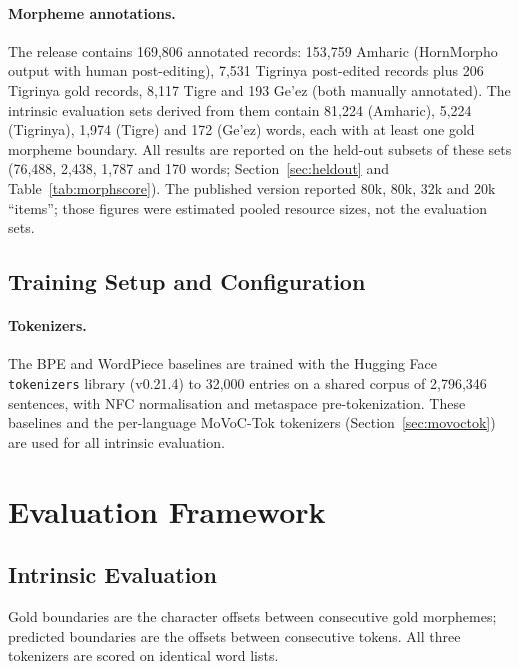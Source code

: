 \documentclass[11pt]{article}
\newcommand{\movoctok}{MoVoC-Tok}
\begin{document}
\paragraph{Morpheme annotations.} The release contains 169,806 annotated
records: 153,759 Amharic (HornMorpho output with human post-editing), 7,531
Tigrinya post-edited records plus 206 Tigrinya gold records, 8,117 Tigre and
193 Ge'ez (both manually annotated). The intrinsic evaluation sets derived from
them contain 81,224 (Amharic), 5,224 (Tigrinya), 1,974 (Tigre) and 172
(Ge'ez) words, each with at least one gold morpheme boundary. All results are
reported on the held-out subsets of these sets (76,488, 2,438, 1,787 and 170
words; Section~\ref{sec:heldout} and Table~\ref{tab:morphscore}). The
published version reported 80k, 80k, 32k and 20k ``items''; those figures were
estimated pooled resource sizes, not the evaluation sets.

\subsection{Training Setup and Configuration}
\label{sec:config}

\paragraph{Tokenizers.} The BPE and WordPiece baselines are trained with the
Hugging Face \texttt{tokenizers} library (v0.21.4) to 32,000 entries on a
shared corpus of 2,796,346 sentences, with NFC normalisation and metaspace
pre-tokenization. These baselines and the per-language \movoctok{} tokenizers
(Section~\ref{sec:movoctok}) are used for all intrinsic evaluation.

\section{Evaluation Framework}
\label{sec:eval}

\subsection{Intrinsic Evaluation}
\label{sec:intrinsic-def}

Gold boundaries are the character offsets between consecutive gold morphemes;
predicted boundaries are the offsets between consecutive tokens. All three
tokenizers are scored on identical word lists.
\end{document}
